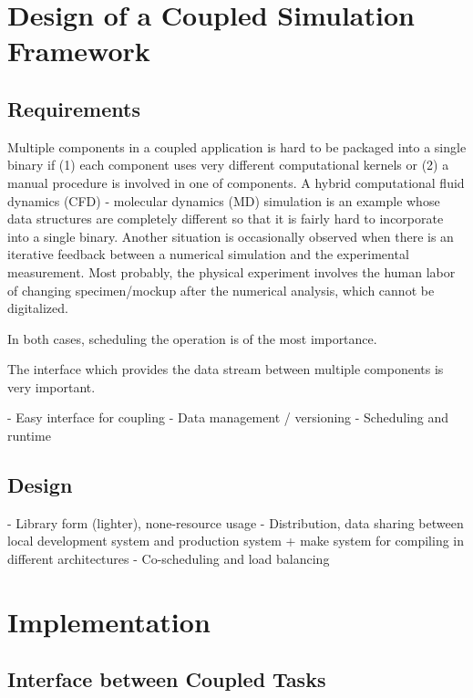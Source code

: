 \documentclass[10pt,conference]{IEEEtran}
\begin{document}
\section{Design of a Coupled Simulation Framework}
\label{sec:design}

\subsection{Requirements}
Multiple components in a coupled application is hard to be packaged 
into a single binary if 
(1) each component uses very different computational kernels 
or 
(2) a manual procedure is involved in one of components.
A hybrid computational fluid dynamics (CFD) - molecular dynamics (MD) 
simulation is an example whose data structures are completely different
so that it is fairly hard to incorporate into a single binary.
Another situation is occasionally observed when there is an iterative
feedback between a numerical simulation and the experimental measurement.
Most probably, the physical experiment involves the human labor
of changing specimen/mockup after the numerical analysis, 
which cannot be digitalized.

In both cases, scheduling the operation is of the most importance.


The interface which provides the data stream between multiple components 
is very important.



- Easy interface for coupling
- Data management / versioning
- Scheduling and runtime

\subsection{Design}
- Library form (lighter), none-resource usage
- Distribution, data sharing between local development system and production system + make system for compiling in different architectures
- Co-scheduling and load balancing

\section{Implementation}
\label{sec:implementation}

\subsection{Interface between Coupled Tasks}
\end{document}
